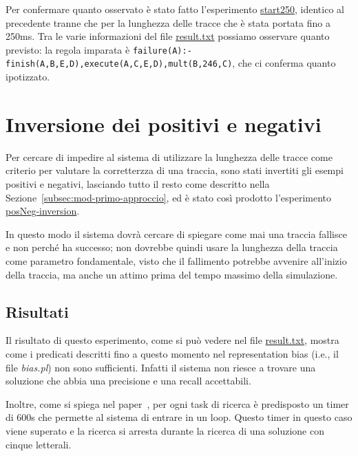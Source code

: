 Per confermare quanto osservato è stato fatto l'esperimento \href{https://github.com/edoardosarri24/numsynth/tree/main/my-experiments/2-start250/}{start250}, identico al precedente tranne che per la lunghezza delle tracce che è stata portata fino a 250ms. Tra le varie informazioni del file \href{https://github.com/edoardosarri24/numsynth/tree/main/my-experiments/2-start250/result.txt}{result.txt} possiamo osservare quanto previsto: la regola imparata è \texttt{failure(A):- finish(A,B,E,D),execute(A,C,E,D),mult(B,246,C)}, che ci conferma quanto ipotizzato.

\section{Inversione dei positivi e negativi}
\label{sec:posNeg-inversion}
Per cercare di impedire al sistema di utilizzare la lunghezza delle tracce come criterio per valutare la corretterzza di una traccia, sono stati invertiti gli esempi positivi e negativi, lasciando tutto il resto come descritto nella Sezione~\ref{subsec:mod-primo-approccio}, ed è stato così prodotto l'esperimento \href{https://github.com/edoardosarri24/numsynth/tree/main/my-experiments/3-posNeg-inversion}{posNeg-inversion}.

In questo modo il sistema dovrà cercare di spiegare come mai una traccia fallisce e non perché ha successo; non dovrebbe quindi usare la lunghezza della traccia come parametro fondamentale, visto che il fallimento potrebbe avvenire all'inizio della traccia, ma anche un attimo prima del tempo massimo della simulazione.

\subsection{Risultati}
Il risultato di questo esperimento, come si può vedere nel file \href{https://github.com/edoardosarri24/numsynth/tree/main/my-experiments/3-posNeg-inversion/result.txt}{result.txt}, mostra come i predicati descritti fino a questo momento nel representation bias (i.e., il file \textit{bias.pl}) non sono sufficienti. Infatti il sistema non riesce a trovare una soluzione che abbia una precisione e una recall accettabili.

Inoltre, come si spiega nel paper~\cite{numsynth}, per ogni task di ricerca è predisposto un timer di 600s che permette al sistema di entrare in un loop. Questo timer in questo caso viene superato e la ricerca si arresta durante la ricerca di una soluzione con cinque letterali.

